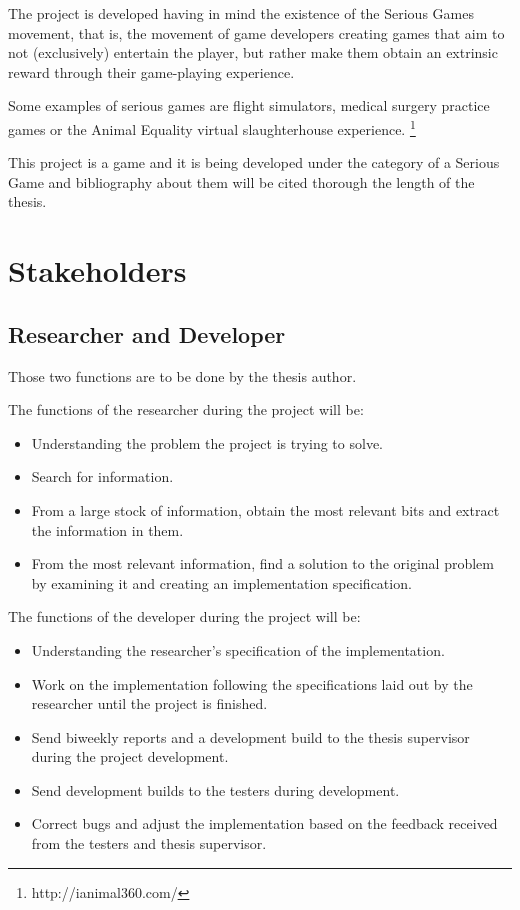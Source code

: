 The project is developed having in mind the existence of the Serious Games movement, that is, the movement of game developers creating games that aim to not (exclusively) entertain the player, but rather make them obtain an extrinsic reward through their game-playing experience.

Some examples of serious games are flight simulators, medical surgery practice games or the Animal Equality virtual slaughterhouse experience.
\footnote{http://ianimal360.com/}

This project is a game and it is being developed under the category of a Serious Game and bibliography about them will be cited thorough the length of the thesis.

\section{Stakeholders}

\subsection{Researcher and Developer}

Those two functions are to be done by the thesis author.

The functions of the researcher during the project will be:

\begin{itemize}
\item Understanding the problem the project is trying to solve.
\item Search for information.
\item From a large stock of information, obtain the most relevant bits and extract the information in them.
\item From the most relevant information, find a solution to the original problem by examining it and creating an implementation specification.
\end{itemize}

The functions of the developer during the project will be:

\begin{itemize}
\item Understanding the researcher's specification of the implementation.
\item Work on the implementation following the specifications laid out by the researcher until the project is finished.
\item Send biweekly reports and a development build to the thesis supervisor during the project development.
\item Send development builds to the testers during development.
\item Correct bugs and adjust the implementation based on the feedback received from the testers and thesis supervisor.
\end{itemize}

